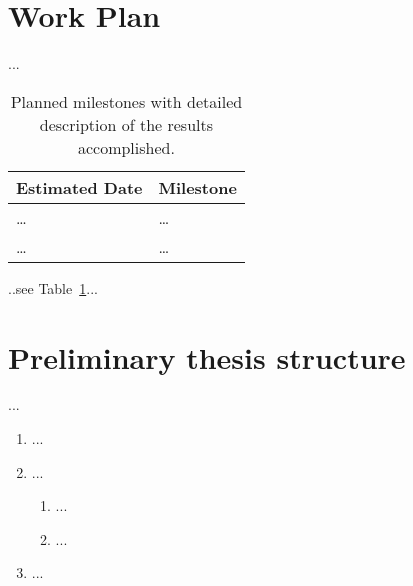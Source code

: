 \section{Work Plan} 

...


\begin{center}
  \begin{table}[h!bt]
    \begin{tabularx}{\textwidth}{ | p{3cm} |  X | }
      
      \hline
         \textbf{Estimated Date}
           & \textbf{Milestone}\\
           
      \hline

      \ldots
          & \ldots\\

      \hline

      \ldots
          & \ldots\\

      \hline

    \end{tabularx}
    \caption[Annotated References]{Planned milestones with detailed description of the results accomplished.}
    \label{tab:workplan}
  \end{table}
\end{center}

..see Table~\ref{tab:workplan}...

\section{Preliminary thesis structure} 

...

\begin{enumerate}
	\item ...
	\item ...
		\begin{enumerate}[label*=\arabic*.]
			\item ...
			\item ...
		\end{enumerate}
	\item ...
\end{enumerate}




